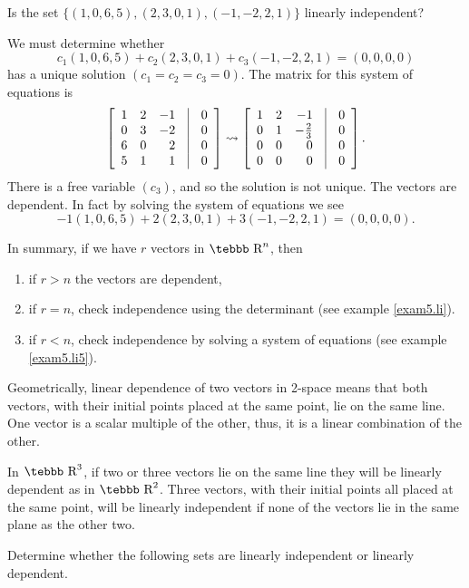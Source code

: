 \begin{example}
\label{exam5.li5}
Is the set $\{(1,0,6,5), (2,3,0,1), (-1,-2,2,1)\}$ linearly independent?

We must determine whether
$$c_1(1,0,6,5)+c_2(2,3,0,1)+c_3(-1,-2,2,1)=(0,0,0,0)$$
has a unique solution $(c_1=c_2=c_3=0)$.  The matrix for this system of equations is
$$\left [\begin{array}{rrrcr} 1&2&-1&\vline&0\\
0&3&-2&\vline&0\\
6&0&2&\vline&0\\
5&1&1&\vline&0\end{array}\right]
\leadsto
\left[\begin{array}{rrrcr} 1&2&-1&\vline&0\\
0&1&-\frac{2}{3}&\vline&0\\
0&0&0&\vline&0\\
0&0&0&\vline&0\end{array}\right].$$
There is a free variable $(c_3)$, and so the solution is not unique.  The vectors are dependent.  In fact by solving the system of equations we see
$$-1(1,0,6,5)+2(2,3,0,1)+3(-1,-2,2,1)=(0,0,0,0).$$
\end{example}

In summary, if we have $r$ vectors in $\mbox{\tebbb R}^n$, then
\begin{enumerate}
\item  if $r>n$ the vectors are dependent,
\item  if $r=n$, check independence using the determinant (see example \ref{exam5.li}).
\item  if $r<n$, check independence by solving a system of equations (see example \ref{exam5.li5}).
\end{enumerate}

Geometrically, linear dependence of two vectors in 2-space means
that both vectors, with their initial points placed at the same
point, lie on the same line. One vector is a scalar multiple of
the other, thus, it is a linear combination of the other.

In $\mbox{\tebbb R}^3$, if two or three vectors lie on the same
line they will be linearly dependent as in $\mbox{\tebbb R}^2$.
Three vectors, with their initial points all placed at the same
point, will be linearly independent if none of the vectors lie in
the same plane as the other two.


Determine whether the following sets are linearly independent or
linearly dependent.

